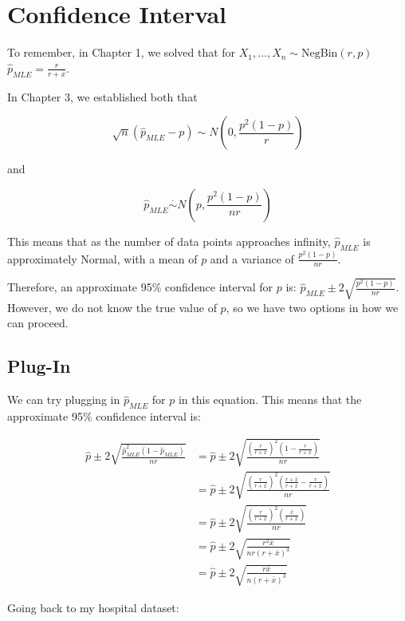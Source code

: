 \documentclass[
  letterpaper,
  DIV=11,
  numbers=noendperiod]{scrreprt}
\begin{document}
\section{Confidence Interval}\label{confidence-interval}

To remember, in Chapter 1, we solved that for
\(X_1,...,X_n \sim \text{NegBin}(r, p)\)
\(\hat{p}_{MLE} = \frac{r}{r + \bar{x}}\).

In Chapter 3, we established both that

\[
  \sqrt{n} (\hat{p}_{MLE} - p) \sim N\left(0, \frac{p^2(1-p)}{r}\right)
\]

and

\[
\hat{p}_{MLE} \overset{\cdot}{\sim} N\left(p, \frac{p^2(1-p)}{nr} \right)
\]

This means that as the number of data points approaches infinity,
\(\hat{p}_{MLE}\) is approximately Normal, with a mean of \(p\) and a
variance of \(\frac{p^2(1-p)}{nr}\).

Therefore, an approximate 95\% confidence interval for \(p\) is:
\(\hat{p}_{MLE} \pm 2 \sqrt{\frac{p^2(1-p)}{nr}}\). However, we do not
know the true value of \(p\), so we have two options in how we can
proceed.

\subsection{Plug-In}\label{plug-in}

We can try plugging in \(\hat{p}_{MLE}\) for \(p\) in this equation.
This means that the approximate 95\% confidence interval is:

\[
\begin{aligned}
\hat{p} \pm 2 \sqrt{\frac{\hat{p}_{MLE}^2(1-\hat{p}_{MLE})}{nr}} 
&= \hat{p} \pm 2 \sqrt{\frac{\left( \frac{r}{r + \bar{x}} \right)^2 \left( 1-\frac{r}{r + \bar{x}} \right)}{nr}} \\
&= \hat{p} \pm 2 \sqrt{\frac{\left( \frac{r}{r + \bar{x}} \right)^2 \left( \frac{r + \bar{x}}{r + \bar{x}}-\frac{r}{r + \bar{x}} \right)}{nr}} \\
&= \hat{p} \pm 2 \sqrt{\frac{\left( \frac{r}{r + \bar{x}} \right)^2 \left( \frac{\bar{x}}{r + \bar{x}} \right)}{nr}} \\
&= \hat{p} \pm 2 \sqrt{\frac{r^2\bar{x}}{nr(r + \bar{x})^3}} \\
&= \hat{p} \pm 2 \sqrt{\frac{r\bar{x}}{n(r + \bar{x})^3}}
\end{aligned}
\]

Going back to my hospital dataset:
\end{document}
